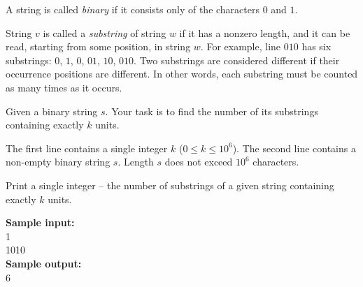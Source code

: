 \documentclass[a4paper]{article}
\begin{document}
A string is called \textit{binary} if it consists only of the characters $0$ and $1$.

String $v$ is called a \textit{substring} of string $w$ if it has a nonzero length, and it can be read, starting from some position, in string $w$. For example, line $010$ has six substrings: $0$, $1$, $0$, $01$, $10$, $010$. Two substrings are considered different if their occurrence positions are different. In other words, each substring must be counted as many times as it occurs.

Given a binary string $s$. Your task is to find the number of its substrings containing exactly $k$ units.

The first line contains a single integer $k$ ($0 \le k \le 10^6$). The second line contains a non-empty binary string $s$. Length $s$ does not exceed $10^6$ characters.

Print a single integer -- the number of substrings of a given string containing exactly $k$ units.

\LINE

\noindent \textbf{Sample input:}\\
1\\
1010\\


\noindent \textbf{Sample output:}\\
6
\end{document}
